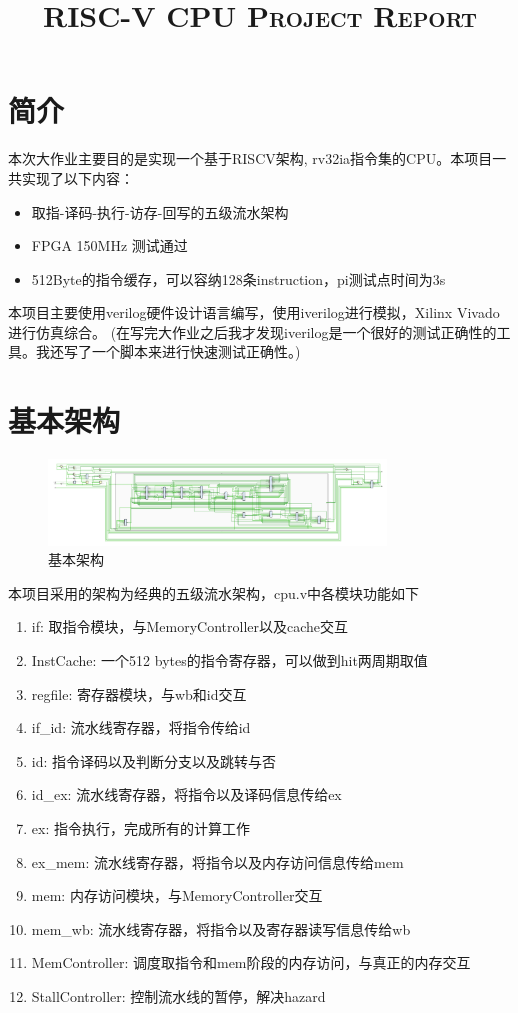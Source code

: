 
\title{\Huge\textsc{RISC-V CPU Project Report}}

\maketitle
 
\section{简介}
本次大作业主要目的是实现一个基于RISCV架构, rv32ia指令集的CPU。本项目一共实现了以下内容：
\begin{itemize}
		\item 取指-译码-执行-访存-回写的五级流水架构
		\item FPGA 150MHz 测试通过
		\item 512Byte的指令缓存，可以容纳128条instruction，pi测试点时间为3s
\end{itemize}

本项目主要使用verilog硬件设计语言编写，使用iverilog进行模拟，Xilinx Vivado进行仿真综合。
(在写完大作业之后我才发现iverilog是一个很好的测试正确性的工具。我还写了一个脚本来进行快速测试正确性。)
\section{基本架构}
\begin{figure}[htpb]
		\centering
		\includegraphics[width=0.8\textwidth]{arch.png}
		\caption{基本架构}
		\label{fig:arch-png}
\end{figure}
本项目采用的架构为经典的五级流水架构，cpu.v中各模块功能如下
\begin{enumerate}\setlength{\itemsep}{-0.06cm}
		\item if: 取指令模块，与MemoryController以及cache交互
		\item InstCache: 一个512 bytes的指令寄存器，可以做到hit两周期取值
		\item regfile: 寄存器模块，与wb和id交互
		\item if\_id: 流水线寄存器，将指令传给id
		\item id: 指令译码以及判断分支以及跳转与否
		\item id\_ex: 流水线寄存器，将指令以及译码信息传给ex
		\item ex: 指令执行，完成所有的计算工作
		\item ex\_mem: 流水线寄存器，将指令以及内存访问信息传给mem
		\item mem: 内存访问模块，与MemoryController交互
		\item mem\_wb: 流水线寄存器，将指令以及寄存器读写信息传给wb
		\item MemController: 调度取指令和mem阶段的内存访问，与真正的内存交互
		\item StallController: 控制流水线的暂停，解决hazard
\end{enumerate}
